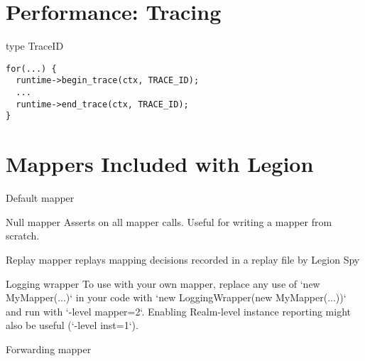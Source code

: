 

\section{Performance: Tracing}


type TraceID
\begin{lstlisting}
for(...) {
  runtime->begin_trace(ctx, TRACE_ID);
  ...
  runtime->end_trace(ctx, TRACE_ID);
}
\end{lstlisting}

\section{Mappers Included with Legion}

Default mapper

Null mapper
Asserts on all mapper calls. Useful for writing a mapper from scratch.

Replay mapper
replays mapping decisions recorded in a replay file by Legion Spy

Logging wrapper
 To use with your own mapper, replace any use of `new MyMapper(...)` in your
 code with `new LoggingWrapper(new MyMapper(...))` and run with
 `-level mapper=2`. Enabling Realm-level instance reporting might also be
 useful (`-level inst=1`).

Forwarding mapper

